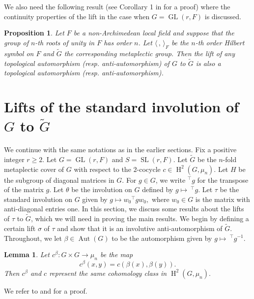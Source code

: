 \documentclass[11pt, a4paper, reqno]{amsart}
\newtheorem{lemma}[theorem]{Lemma}
\newtheorem{proposition}[theorem]{Proposition}
\theoremstyle{definition}
\theoremstyle{remark}
\theoremstyle{example}
\theoremstyle{note}
\numberwithin{equation}{section}
\DeclareMathOperator{\GL}{GL}
\DeclareMathOperator{\SL}{SL}
\DeclareMathOperator{\Aut}{Aut}
\DeclareMathOperator{\coh}{H}
\begin{document}
We also need the following result (see Corollary 1 in \cite{Kab} for a proof) where the continuity properties of the lift in the case when $G=\GL(r,F)$ is discussed. 

\begin{proposition}\label{continuity of lift} Let $F$ be a non-Archimedean local field and suppose that the group of $n$-{th} roots of unity in $F$ has order $n$. Let $\langle \, , \, \rangle_F$ be the $n$-th order Hilbert symbol on $F$ and $\widetilde{G}$ the corresponding metaplectic group. Then the lift of any topological automorphism (resp. anti-automorphism) of $G$ to $\widetilde{G}$ is also a topological automorphism (resp. anti-automorphism).
\end{proposition}




\section{Lifts of the standard involution of $G$ to $\widetilde{G}$}\label{Lift of the standard involution}


We continue with the same notations as in the earlier sections. Fix a positive integer $r \geq2$. Let $G=\GL(r,F)$ and $S=\SL(r,F)$. Let $\widetilde{G}$ be the $n$-fold metaplectic cover of $G$ with respect to the $2$-cocycle $c\in \coh^{2}(G, \mu_{n})$. Let $H$ be the subgroup of diagonal matrices in $G$. For $g\in G$, we write $^{\top}g$ for the transpose of the matrix $g$.  Let $\theta$ be the involution on $G$ defined by $g \mapsto ~^{\top}g$. Let $\tau$ be the standard involution on $G$ given by $g \mapsto w_{0}{}^\top gw_{0},$ where $w_{0}\in G$ is the matrix with anti-diagonal entries one. In this section, we discuss some results about the lifts of $\tau$ to $\widetilde{G}$, which we will need in proving the main results. We begin by defining a certain lift $\sigma$ of $\tau$ and show that it is an involutive anti-automorphism of $\widetilde{G}$.
Throughout, we let $\beta\in \Aut(G)$ to be the automorphism given by $g \mapsto ~^{\top}g^{-1}.$ 

\begin{lemma}\label{c beta and c are cohomologous on G} Let $c^\beta: G \times G \to \mu_n$ be the map
$$c^\beta(x, y) =c(\beta(x), \beta(y)).$$ 
Then $c^\beta$ and $c$ represent the same cohomology class in $\coh^2(G, \mu_n).$
\end{lemma}
We refer to  \cite[Proposition~3.1]{KazPat} and \cite[Lemma~2 \& Proposition~1]{Kab} for a proof. \\
\end{document}
